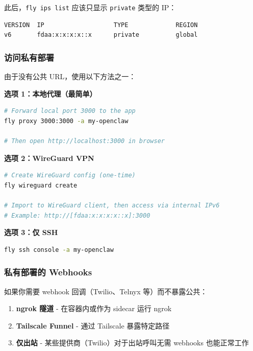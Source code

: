 此后，\texttt{fly ips list} 应该只显示 \texttt{private} 类型的 IP：

\begin{lstlisting}
VERSION  IP                   TYPE             REGION
v6       fdaa:x:x:x:x::x      private          global
\end{lstlisting}


\subsubsection{访问私有部署}


由于没有公共 URL，使用以下方法之一：

\textbf{选项 1：本地代理（最简单）}

\begin{lstlisting}[language=bash]
# Forward local port 3000 to the app
fly proxy 3000:3000 -a my-openclaw

# Then open http://localhost:3000 in browser
\end{lstlisting}


\textbf{选项 2：WireGuard VPN}

\begin{lstlisting}[language=bash]
# Create WireGuard config (one-time)
fly wireguard create

# Import to WireGuard client, then access via internal IPv6
# Example: http://[fdaa:x:x:x:x::x]:3000
\end{lstlisting}


\textbf{选项 3：仅 SSH}

\begin{lstlisting}[language=bash]
fly ssh console -a my-openclaw
\end{lstlisting}


\subsubsection{私有部署的 Webhooks}


如果你需要 webhook 回调（Twilio、Telnyx 等）而不暴露公共：

\begin{enumerate}
  \item \textbf{ngrok 隧道} - 在容器内或作为 sidecar 运行 ngrok
  \item \textbf{Tailscale Funnel} - 通过 Tailscale 暴露特定路径
  \item \textbf{仅出站} - 某些提供商（Twilio）对于出站呼叫无需 webhooks 也能正常工作
\end{enumerate}


